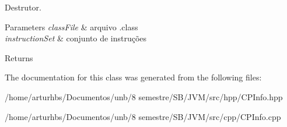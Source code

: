 Destrutor. 


\begin{DoxyParams}{Parameters}
{\em class\+File} & arquivo .class \\
\hline
{\em instruction\+Set} & conjunto de instruções \\
\hline
\end{DoxyParams}
\begin{DoxyReturn}{Returns}

\end{DoxyReturn}


The documentation for this class was generated from the following files\+:\begin{DoxyCompactItemize}
\item 
/home/arturhbs/\+Documentos/unb/8 semestre/\+S\+B/\+J\+V\+M/src/hpp/C\+P\+Info.\+hpp\item 
/home/arturhbs/\+Documentos/unb/8 semestre/\+S\+B/\+J\+V\+M/src/cpp/C\+P\+Info.\+cpp\end{DoxyCompactItemize}
